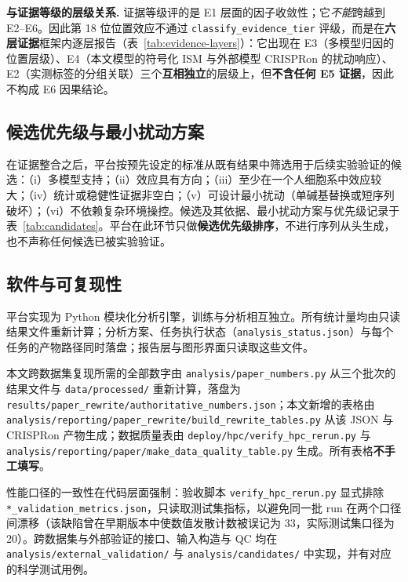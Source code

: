 \textbf{与证据等级的层级关系.} 证据等级评的是 E1 层面的因子收敛性；它\emph{不能}跨越到 E2--E6。因此第 18 位位置效应不通过 \texttt{classify\_evidence\_tier} 评级，而是在\textbf{六层证据}框架内逐层报告（表~\ref{tab:evidence-layers}）：它出现在 E3（多模型归因的位置层级）、E4（本文模型的符号化 ISM 与外部模型 CRISPRon 的扰动响应）、E2（实测标签的分组关联）三个\textbf{互相独立}的层级上，但\textbf{不含任何 E5 证据}，因此不构成 E6 因果结论。

\subsection{候选优先级与最小扰动方案}
\label{sec:methods-candidates}

在证据整合之后，平台按预先设定的标准从既有结果中筛选用于后续实验验证的候选：（i）多模型支持；（ii）效应具有方向；（iii）至少在一个人细胞系中效应较大；（iv）统计或稳健性证据非空白；（v）可设计最小扰动（单碱基替换或短序列破坏）；（vi）不依赖复杂环境操控。候选及其依据、最小扰动方案与优先级记录于表~\ref{tab:candidates}。平台在此环节只做\textbf{候选优先级排序}，不进行序列从头生成，也不声称任何候选已被实验验证。

\subsection{软件与可复现性}
\label{sec:methods-software}

平台实现为 Python 模块化分析引擎，训练与分析相互独立。所有统计量均由只读结果文件重新计算；分析方案、任务执行状态（\texttt{analysis\_status.json}）与每个任务的产物路径同时落盘；报告层与图形界面只读取这些文件。

本文跨数据集复现所需的全部数字由 \texttt{analysis/paper\_numbers.py} 从三个批次的结果文件与 \texttt{data/processed/} 重新计算，落盘为 \texttt{results/paper\_rewrite/authoritative\_numbers.json}；本文新增的表格由 \texttt{analysis/reporting/paper\_rewrite/build\_rewrite\_tables.py} 从该 JSON 与 CRISPRon 产物生成；数据质量表由 \texttt{deploy/hpc/verify\_hpc\_rerun.py} 与 \texttt{analysis/reporting/paper/make\_data\_quality\_table.py} 生成。所有表格\textbf{不手工填写}。

性能口径的一致性在代码层面强制：验收脚本 \texttt{verify\_hpc\_rerun.py} 显式排除 \texttt{*\_validation\_metrics.json}，只读取测试集指标，以避免同一批 run 在两个口径间漂移（该缺陷曾在早期版本中使数值发散计数被误记为 33，实际测试集口径为 20）。跨数据集与外部验证的接口、输入构造与 QC 均在 \texttt{analysis/external\_validation/} 与 \texttt{analysis/candidates/} 中实现，并有对应的科学测试用例。
